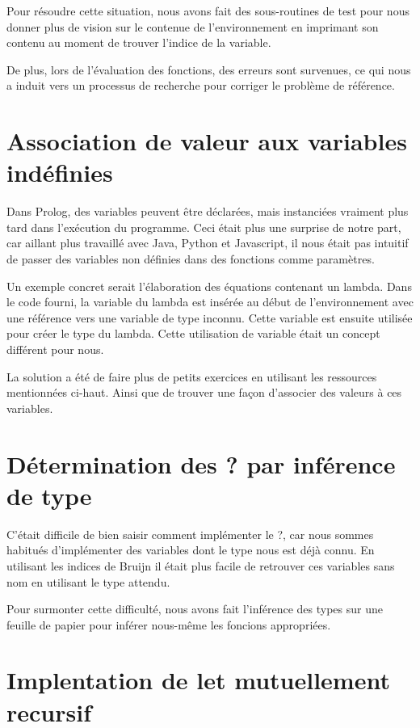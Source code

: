 \documentclass[12pt, letterpaper]{article}
\begin{document}
Pour résoudre cette situation, nous avons fait des sous-routines de test 
pour nous donner plus de vision sur le contenue de l'environnement en imprimant
son contenu au moment de trouver l'indice de la variable.

De plus, lors de l'évaluation des fonctions, des erreurs sont survenues, ce qui
nous a induit vers un processus de recherche pour corriger le problème de 
référence.

\section*{Association de valeur aux variables indéfinies}

Dans Prolog, des variables peuvent être déclarées, mais instanciées 
vraiment plus tard dans l'exécution du programme. Ceci était plus une surprise 
de notre part, car aillant plus travaillé avec Java, Python et Javascript,
il nous était pas intuitif de passer des variables non définies dans des 
fonctions comme paramètres.

Un exemple concret serait l'élaboration des équations contenant un lambda.
Dans le code fourni, la variable du lambda est insérée au début de 
l'environnement avec une référence vers une variable de type inconnu. Cette 
variable est ensuite utilisée pour créer le type du lambda. Cette utilisation 
de variable était un concept différent pour nous.

La solution a été de faire plus de petits exercices en utilisant les ressources 
mentionnées ci-haut. Ainsi que de trouver une façon d'associer des valeurs 
à ces variables.

\section*{Détermination des ? par inférence de type}

C'était difficile de bien saisir comment implémenter le ?, car nous sommes 
habitués d'implémenter des variables dont le type nous est déjà connu.
En utilisant les indices de Bruijn il était plus facile de retrouver ces 
variables sans nom en utilisant le type attendu.

Pour surmonter cette difficulté, nous avons fait l'inférence des types sur
une feuille de papier pour inférer nous-même les foncions appropriées.

\section*{Implentation de let mutuellement recursif}
\end{document}
